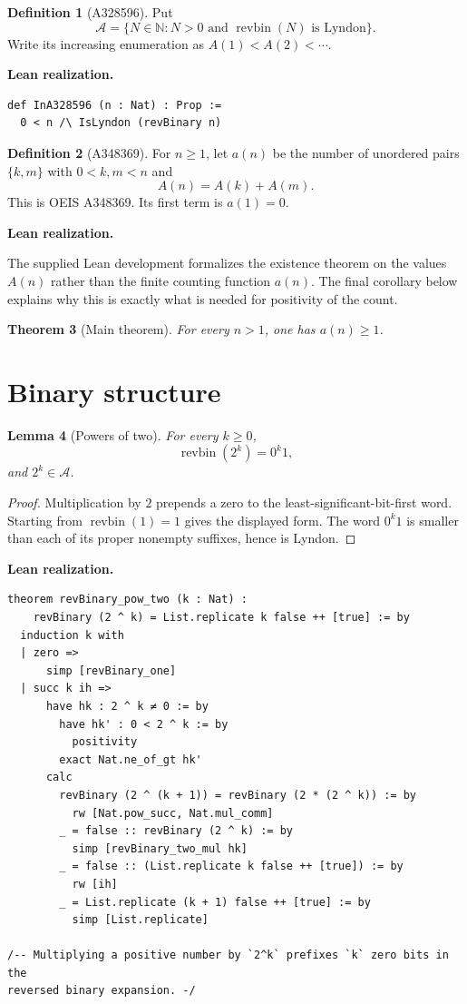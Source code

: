 \documentclass[11pt]{article}
\newtheorem{theorem}{Theorem}[section]
\newtheorem{lemma}[theorem]{Lemma}
\theoremstyle{definition}
\newtheorem{definition}[theorem]{Definition}
\theoremstyle{remark}
\newenvironment{leanbridge}{%
  \par\smallskip\noindent\textbf{Lean realization.}\par\smallskip%
}{%
  \par\smallskip%
}
\newcommand{\SeqA}{\mathcal{A}}
\newcommand{\revbin}{\operatorname{revbin}}
\begin{document}
\begin{definition}[A328596]
Put
\[
  \SeqA=\{N\in\mathbb N: N>0\text{ and }\revbin(N)\text{ is Lyndon}\}.
\]
Write its increasing enumeration as $A(1)<A(2)<\cdots$.
\end{definition}
\begin{leanbridge}
\begin{lstlisting}
def InA328596 (n : Nat) : Prop :=
  0 < n /\ IsLyndon (revBinary n)
\end{lstlisting}
\end{leanbridge}

\begin{definition}[A348369]
For $n\geq1$, let $a(n)$ be the number of unordered pairs $\{k,m\}$ with
$0<k,m<n$ and
\[
                  A(n)=A(k)+A(m).
\]
This is OEIS A348369.  Its first term is $a(1)=0$.
\end{definition}
\begin{leanbridge}
The supplied Lean development formalizes the existence theorem
on the values $A(n)$ rather than the finite counting function $a(n)$.
The final corollary below explains why this is exactly what is needed for
positivity of the count.
\end{leanbridge}

\begin{theorem}[Main theorem]\label{thm:main}
For every $n>1$, one has $a(n)\geq1$.
\end{theorem}

\section{Binary structure}

\begin{lemma}[Powers of two]\label{lem:powers}
For every $k\geq0$,
\[
             \revbin(2^k)=0^k1,
\]
and $2^k\in\SeqA$.
\end{lemma}
\begin{proof}
Multiplication by $2$ prepends a zero to the least-significant-bit-first word.
Starting from $\revbin(1)=1$ gives the displayed form.  The word $0^k1$ is
smaller than each of its proper nonempty suffixes, hence is Lyndon.
\end{proof}
\begin{leanbridge}
\begin{lstlisting}
theorem revBinary_pow_two (k : Nat) :
    revBinary (2 ^ k) = List.replicate k false ++ [true] := by
  induction k with
  | zero =>
      simp [revBinary_one]
  | succ k ih =>
      have hk : 2 ^ k ≠ 0 := by
        have hk' : 0 < 2 ^ k := by
          positivity
        exact Nat.ne_of_gt hk'
      calc
        revBinary (2 ^ (k + 1)) = revBinary (2 * (2 ^ k)) := by
          rw [Nat.pow_succ, Nat.mul_comm]
        _ = false :: revBinary (2 ^ k) := by
          simp [revBinary_two_mul hk]
        _ = false :: (List.replicate k false ++ [true]) := by
          rw [ih]
        _ = List.replicate (k + 1) false ++ [true] := by
          simp [List.replicate]

/-- Multiplying a positive number by `2^k` prefixes `k` zero bits in the
reversed binary expansion. -/
\end{lstlisting}
\end{leanbridge}
\end{document}
